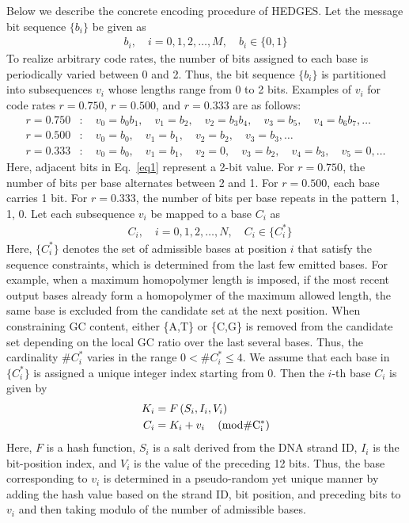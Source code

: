 \documentclass[sotsuron]{kuee}
\begin{document}
Below we describe the concrete encoding procedure of HEDGES.
Let the message bit sequence $\{b_i\}$ be given as
\begin{align}
  b_i, \quad i=0,1,2,\ldots, M, \quad b_i \in \{0,1\}
\end{align}
To realize arbitrary code rates, the number of bits assigned to each base is periodically varied between 0 and 2.
Thus, the bit sequence $\{b_i\}$ is partitioned into subsequences $v_i$ whose lengths range from 0 to 2 bits.
Examples of $v_i$ for code rates $r=0.750$, $r=0.500$, and $r=0.333$ are as follows:
\begin{align}
  r=0.750&: \quad v_0 = b_0b_1, \quad v_1 = b_2, \quad v_2 = b_3b_4, \quad v_3 = b_5, \quad v_4 = b_6b_7, \ldots \label{eq1} \\
  r=0.500&: \quad v_0 = b_0, \quad v_1 = b_1, \quad v_2 = b_2, \quad v_3 = b_3, \ldots \\
  r=0.333&: \quad v_0 = b_0, \quad v_1 = b_1, \quad v_2 = 0, \quad v_3 = b_2, \quad v_4 = b_3, \quad v_5 = 0, \ldots
\end{align}
Here, adjacent bits in Eq.~\eqref{eq1} represent a 2-bit value.
For $r=0.750$, the number of bits per base alternates between 2 and 1.
For $r=0.500$, each base carries 1 bit.
For $r=0.333$, the number of bits per base repeats in the pattern 1, 1, 0.
Let each subsequence $v_i$ be mapped to a base $C_i$ as
\begin{align}
  &C_i, \quad i=0,1,2,\ldots ,N, \quad C_i \in \{C_i^*\}
\end{align}
Here, $\{C_i^*\}$ denotes the set of admissible bases at position $i$ that satisfy the sequence constraints,
which is determined from the last few emitted bases.
For example, when a maximum homopolymer length is imposed, if the most recent output bases already form a homopolymer
of the maximum allowed length, the same base is excluded from the candidate set at the next position.
When constraining GC content, either \{A,T\} or \{C,G\} is removed from the candidate set depending on the local
GC ratio over the last several bases.
Thus, the cardinality $\#C_i^*$ varies in the range $0 < \#C_i^* \leq 4$.
We assume that each base in $\{C_i^*\}$ is assigned a unique integer index starting from 0.
Then the $i$-th base $C_i$ is given by
\begin{align}
  K_i &= F\left( S_i, I_i, V_i \right) \\
  C_i &=  K_i + v_i  \quad \left(\rm{mod} \#C_i^*\right) \label{encode}
\end{align}
Here, $F$ is a hash function, $S_i$ is a salt derived from the DNA strand ID,
$I_i$ is the bit-position index, and $V_i$ is the value of the preceding 12 bits.
Thus, the base corresponding to $v_i$ is determined in a pseudo-random yet unique manner by adding the hash value
based on the strand ID, bit position, and preceding bits to $v_i$ and then taking modulo of the number of
admissible bases.
\end{document}
